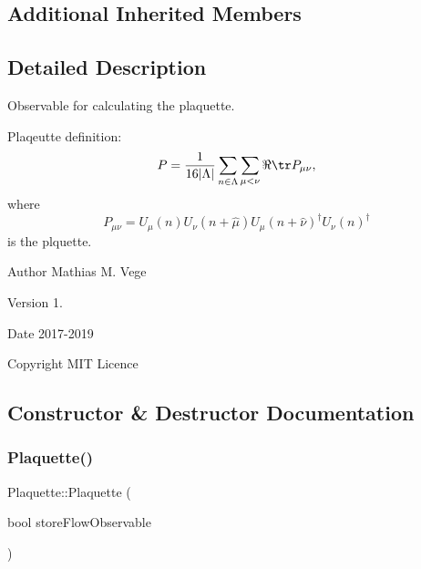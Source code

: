 \subsection*{Additional Inherited Members}


\subsection{Detailed Description}
Observable for calculating the plaquette. 

Plaqeutte definition\+: \[ P = \frac{1}{16|\Lambda|} \sum_{n\in\Lambda} \sum_{\mu < \nu} \Re \tr P_{\mu\nu}, \] where \[ P_{\mu\nu}=U_\mu(n) U_{\nu}(n+\hat{\mu}) U_{\mu}(n+\hat{\nu})^\dagger U_{\nu} (n)^\dagger \] is the plquette.

\begin{DoxyAuthor}{Author}
Mathias M. Vege 
\end{DoxyAuthor}
\begin{DoxyVersion}{Version}
1. 
\end{DoxyVersion}
\begin{DoxyDate}{Date}
2017-\/2019 
\end{DoxyDate}
\begin{DoxyCopyright}{Copyright}
M\+IT Licence 
\end{DoxyCopyright}


\subsection{Constructor \& Destructor Documentation}
\mbox{\label{class_plaquette_a1c87b43fc7ee74b2b0289de63e03bb61}} 
\subsubsection{\texorpdfstring{Plaquette()}{Plaquette()}}
{\footnotesize\ttfamily Plaquette\+::\+Plaquette (\begin{DoxyParamCaption}\item[{bool}]{store\+Flow\+Observable }\end{DoxyParamCaption})}

